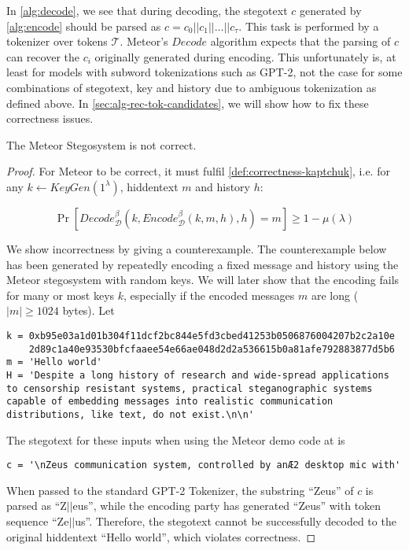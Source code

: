 In \autoref{alg:decode}, we see that during decoding, the stegotext $c$ generated by \autoref{alg:encode} should be parsed as $c = c_0 ||c_1 || \dots || c_{\tau}$.
This task is performed by a tokenizer over tokens $\mathcal{T}$.
Meteor's $Decode$ algorithm expects that the parsing of $c$ can recover the $c_i$ originally generated during encoding.
This unfortunately is, at least for models with subword tokenizations such as GPT-2, not the case for some combinations of stegotext, key and history due to ambiguous tokenization as defined above.
In \autoref{sec:alg-rec-tok-candidates}, we will show how to fix these correctness issues.

\begin{theorem}
The Meteor Stegosystem is not correct.
\end{theorem}

\begin{proof}
For Meteor to be correct, it must fulfil \autoref{def:correctness-kaptchuk}, i.e. for any $k \leftarrow KeyGen(1^\lambda)$, hiddentext $m$ and history $h$:

$$\mathop{Pr}[Decode_{\mathcal{D}}^\beta(k, Encode_{\mathcal{D}}^\beta(k, m, h), h) = m] \geq 1 - \mu(\lambda)$$

We show incorrectness by giving a counterexample. 
The counterexample below has been generated by repeatedly encoding a fixed message and history using the Meteor stegosystem with random keys.
We will later show that the encoding fails for many or most keys $k$, especially if the encoded messages $m$ are long ($|m| \geq 1024$ bytes).
Let

\begin{lstlisting}[breaklines]
k = 0xb95e03a1d01b304f11dcf2bc844e5fd3cbed41253b0506876004207b2c2a10e
    2d89c1a40e93530bfcfaaee54e66ae048d2d2a536615b0a81afe792883877d5b6
m = 'Hello world'
H = 'Despite a long history of research and wide-spread applications to censorship resistant systems, practical steganographic systems capable of embedding messages into realistic communication distributions, like text, do not exist.\n\n'
\end{lstlisting}

The stegotext for these inputs when using the Meteor demo code at \cite{MeteorDemo2021} is

\begin{lstlisting}
c = '\nZeus communication system, controlled by anÆ2 desktop mic with'
\end{lstlisting}

When passed to the standard GPT-2 Tokenizer, the substring ``Zeus'' of $c$ is parsed as ``Z$||$eus'', while the encoding party has generated ``Zeus'' with token sequence ``Ze$||$us''.
Therefore, the stegotext cannot be successfully decoded to the original hiddentext ``Hello world'', which violates correctness.
\end{proof}

